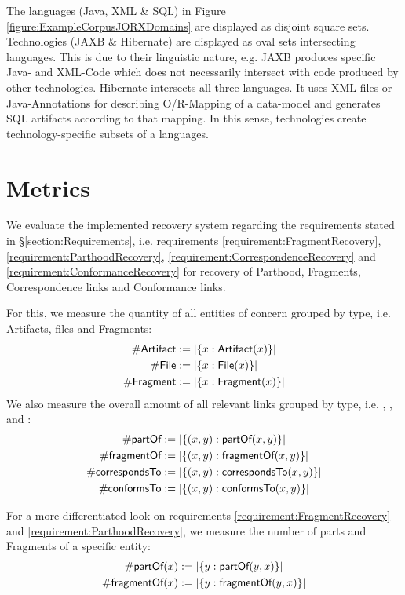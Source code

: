 The languages (\gls{Java}, \gls{XML} \& \gls{SQL}) in Figure \ref{figure:ExampleCorpusJORXDomains} are displayed as disjoint square sets.
Technologies (\gls{JAXB} \& \gls{Hibernate}) are displayed as oval sets intersecting languages.
This is due to their linguistic nature, e.g. \gls{JAXB} produces specific \Gls{Java}- and \gls{XML}-Code which does not necessarily intersect with code produced by other technologies.
\gls{Hibernate} intersects all three languages.
It uses \gls{XML} files or \gls{Java}-Annotations for describing \gls{O/R-Mapping} of a data-model and generates \gls{SQL} artifacts according to that mapping.
In this sense, technologies create technology-specific subsets of a languages.

\section{Metrics}
\label{section:Metrics}
We evaluate the implemented recovery system regarding the requirements stated in §\ref{section:Requirements}, i.e. requirements \ref{requirement:FragmentRecovery}, \ref{requirement:ParthoodRecovery}, \ref{requirement:CorrespondenceRecovery} and \ref{requirement:ConformanceRecovery} for recovery of \gls{Parthood}, \glspl{Fragment}, \gls{Correspondence} links and \gls{Conformance} links.

For this, we measure the quantity of all entities of concern grouped by type, i.e. \glspl{Artifact}, files and \glspl{Fragment}:
\begin{align*}
\#\textsf{Artifact} &:= |\{ x : \textsf{Artifact}(x) \}| \\
\#\textsf{File} &:= |\{ x : \textsf{File}(x) \}| \\
\#\textsf{Fragment} &:= |\{ x : \textsf{Fragment}(x) \}|
\end{align*}
We also measure the overall amount of all relevant links grouped by type, i.e.
\partOf, \fragmentOf, \correspondsTo~ and \conformsTo:
\begin{align*}
\#\textsf{partOf} &:= |\{ (x,y) : \textsf{partOf}(x,y) \}| \\
\#\textsf{fragmentOf} &:= |\{ (x,y) : \textsf{fragmentOf}(x,y) \}| \\
\#\textsf{correspondsTo} &:= |\{ (x,y) : \textsf{correspondsTo}(x,y) \}| \\
\#\textsf{conformsTo} &:= |\{ (x,y) : \textsf{conformsTo}(x,y) \}| 
\end{align*}

For a more differentiated look on requirements \ref{requirement:FragmentRecovery} and \ref{requirement:ParthoodRecovery}, we measure the number of parts and \glspl{Fragment} of a specific entity:
\begin{align*}
\#\textsf{partOf}(x) &:= |\{ y : \textsf{partOf}(y,x) \}| \\
\#\textsf{fragmentOf}(x) &:= |\{ y : \textsf{fragmentOf}(y,x) \}| 
\end{align*}

